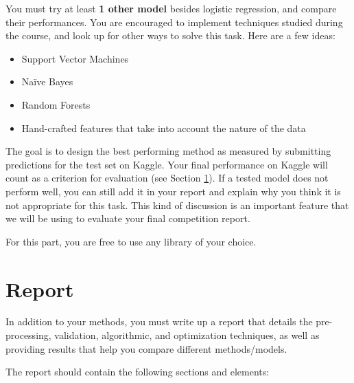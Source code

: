 \documentclass[12pt]{article}
\begin{document}
You must try at least \textbf{1 other model} besides logistic regression, and compare their performances. You are encouraged to implement techniques studied during the course, and look up for other ways to solve this task. Here are a few ideas:

\begin{itemize}
    \item Support Vector Machines
    \item Na\"ive Bayes
    \item Random Forests 
    \item Hand-crafted features that take into account the nature of the data
\end{itemize}

The goal is to design the best performing method as measured by submitting predictions for the test set on Kaggle. Your final performance on Kaggle will count as a criterion for evaluation (see Section \ref{sec:report}). If a tested model does not perform well, you can still add it in your report and explain why you think it is not appropriate for this task. This kind of discussion is an important feature that we will be using to evaluate your final competition report.

For this part, you are free to use any library of your choice.

\section{Report}
\label{sec:report}

In addition to your methods, you must write up a report that details the pre-processing, validation, algorithmic, and optimization techniques, as well as providing results that help you compare different methods/models.

The report should contain the following sections and elements:
\end{document}
